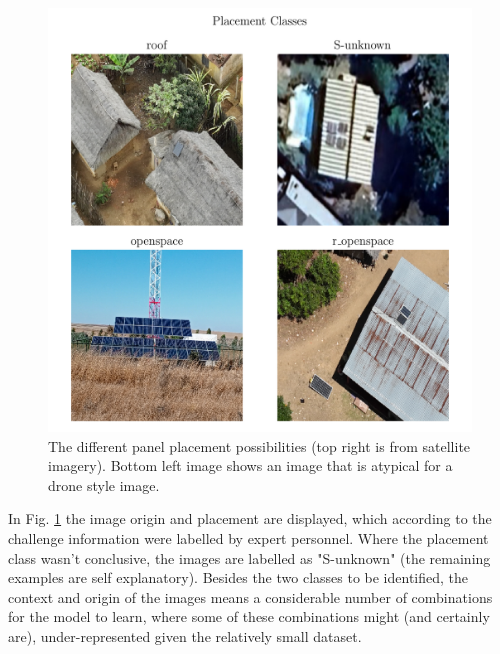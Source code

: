 \documentclass[conference]{IEEEtran}
\begin{document}
\begin{figure}[H]
    \centering
    \includegraphics[width=1\linewidth]{assets/data_placement_classes.png}
    \caption{The different panel placement possibilities (top right is from satellite imagery). Bottom left image shows an image that is atypical for a drone style image.}
    \label{fig:data_placement_classes}
\end{figure}

In Fig. \ref{fig:data_placement_classes} the image origin and placement are displayed, which according to the challenge information were labelled by expert personnel. Where the placement class wasn't conclusive, the images are labelled as "S-unknown" (the remaining examples are self explanatory). Besides the two classes to be identified, the context and origin of the images means a considerable number of combinations for the model to learn, where some of these combinations might (and certainly are), under-represented given the relatively small dataset.
\end{document}
